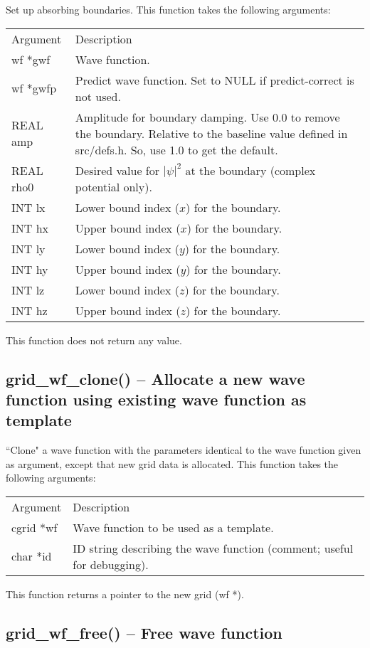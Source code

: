 \documentclass[12pt,letterpaper]{report}
\begin{document}
Set up absorbing boundaries. This function takes the following arguments:
\begin{longtable}{p{} p{}}
Argument & Description\\
\cline{1-2}
wf *gwf & Wave function.\\
wf *gwfp & Predict wave function. Set to NULL if predict-correct is not used.\\
REAL amp & Amplitude for boundary damping. Use 0.0 to remove the boundary. Relative to the baseline value defined in src/defs.h. So, use 1.0 to get the default.\\
REAL rho0 & Desired value for $|\psi|^2$ at the boundary (complex potential only).\\
INT lx & Lower bound index ($x$) for the boundary.\\
INT hx & Upper bound index ($x$) for the boundary.\\
INT ly & Lower bound index ($y$) for the boundary.\\
INT hy & Upper bound index ($y$) for the boundary.\\
INT lz & Lower bound index ($z$) for the boundary.\\
INT hz & Upper bound index ($z$) for the boundary.\\
\end{longtable}
\noindent
This function does not return any value.

\subsection{grid\_wf\_clone() -- Allocate a new wave function using existing wave function as template}

``Clone" a wave function with the parameters identical to the wave function given as argument, except that new grid data is allocated. This function takes the following arguments:
\begin{longtable}{p{} p{}}
Argument & Description\\
\cline{1-2}
cgrid *wf & Wave function to be used as a template.\\
char *id & ID string describing the wave function (comment; useful for debugging).\\
\end{longtable}
\noindent
This function returns a pointer to the new grid (wf *).

\subsection{grid\_wf\_free() -- Free wave function}
\end{document}
